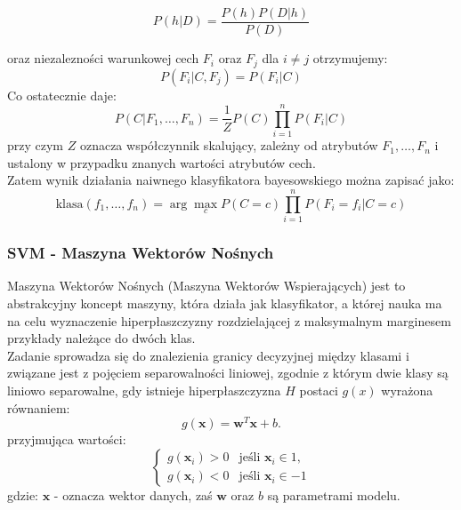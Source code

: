 \begin{equation}
    P(h|D) = \frac{P(h) P(D|h)}{P(D)}
\end{equation}

oraz niezalezności warunkowej cech $F_i$ oraz $F_j$ dla $i \neq j$ otrzymujemy:
\begin{equation}
    P(F_i|C, F_j) = P(F_i|C)
\end{equation}
Co ostatecznie daje:\\

\begin{equation}
    P(C|F_1, \ldots, F_n) = \frac{1}{Z} P(C) \prod_{i=1}^n P(F_i|C)
\end{equation}
przy czym $Z$ oznacza współczynnik skalujący, zależny od atrybutów $F_1, \ldots, F_n$ i ustalony w przypadku znanych wartości atrybutów cech.\\
    
Zatem wynik działania naiwnego klasyfikatora bayesowskiego można zapisać jako:
\begin{equation}
    \text{klasa}(f_1, \ldots, f_n) = \arg\max_c P(C = c) \prod_{i=1}^n P(F_i = f_i | C = c)
\end{equation}

\subsubsection{SVM - Maszyna Wektorów Nośnych \cite{svm_wiki} \cite{wyklad}}
Maszyna Wektorów Nośnych (Maszyna Wektorów Wspierających) jest to abstrakcyjny koncept maszyny, która działa jak klasyfikator, a której nauka ma na celu wyznaczenie hiperpłaszczyzny rozdzielającej z maksymalnym marginesem przykłady należące do dwóch klas.\\

Zadanie sprowadza się do znalezienia granicy decyzyjnej między klasami i związane jest z pojęciem separowalności liniowej, zgodnie z którym dwie klasy są liniowo separowalne, gdy istnieje hiperpłaszczyzna $H$ postaci $g(x)$ wyrażona równaniem:
\begin{equation}
    g(\mathbf{x}) = \mathbf{w}^T \mathbf{x} + b.
\end{equation}
    przyjmująca wartości:
\begin{equation}
    \begin{cases}
    g(\mathbf{x}_i) > 0 & \text{jeśli } \mathbf{x}_i \in 1, \\
    g(\mathbf{x}_i) < 0 & \text{jeśli } \mathbf{x}_i \in -1
    \end{cases}
\end{equation}
    gdzie: $\mathbf{x}$ - oznacza wektor danych, zaś $\mathbf{w}$ oraz $b$ są parametrami modelu.\\

